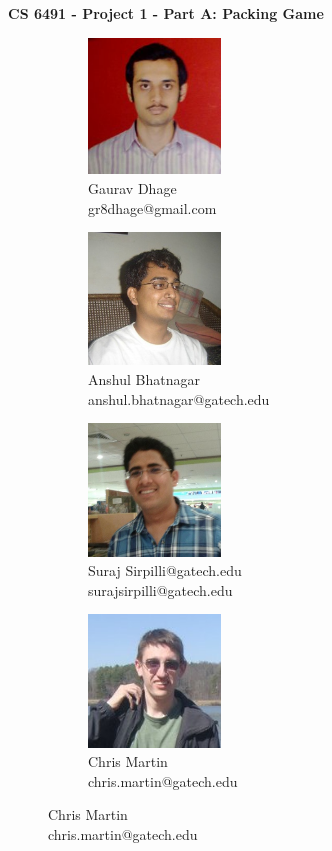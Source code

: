 \documentclass[11pt]{article}
\date{}
\begin{document}
{\Huge \bf CS 6491 - Project 1 - Part A: Packing Game}
\thispagestyle{empty}

\begin{figure}[h]
  \begin{subfigure}[b]{0.24\textwidth}
    \centering
    \includegraphics[width=100pt]{gaurav}
    \caption*{Gaurav Dhage\\gr8dhage@gmail.com}
  \end{subfigure}
  \begin{subfigure}[b]{0.24\textwidth}
    \centering
    \includegraphics[width=100pt]{anshul}
    \caption*{Anshul Bhatnagar\\anshul.bhatnagar@gatech.edu}
  \end{subfigure}
  \begin{subfigure}[b]{0.24\textwidth}
    \centering
    \includegraphics[width=100pt]{suraj}
    \caption*{Suraj Sirpilli@gatech.edu\\surajsirpilli@gatech.edu}
  \end{subfigure}
  \begin{subfigure}[b]{0.24\textwidth}
    \centering
    \includegraphics[width=100pt]{chris}
    \caption*{Chris Martin\\chris.martin@gatech.edu}
  \end{subfigure}
\end{figure}
\end{document}
